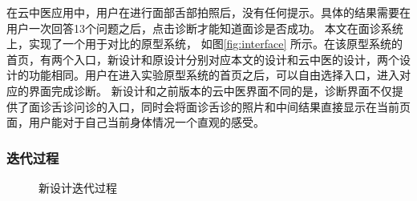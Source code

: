 在云中医应用中，用户在进行面部舌部拍照后，没有任何提示。具体的结果需要在用户一次回答13个问题之后，点击诊断才能知道面诊是否成功。
本文在面诊系统上，实现了一个用于对比的原型系统， 如图\ref{fig:interface} 所示。在该原型系统的首页，有两个入口，新设计和原设计分别对应本文的设计和云中医的设计，两个设计的功能相同。用户在进入实验原型系统的首页之后，可以自由选择入口，进入对应的界面完成诊断。
新设计和之前版本的云中医界面不同的是，诊断界面不仅提供了面诊舌诊问诊的入口，同时会将面诊舌诊的照片和中间结果直接显示在当前页面，用户能对于自己当前身体情况一个直观的感受。

\subsubsection{迭代过程}
\begin{figure}[h]
    \centering
    \caption{新设计迭代过程}
    \label{fig:diag_new}
\end{figure}
